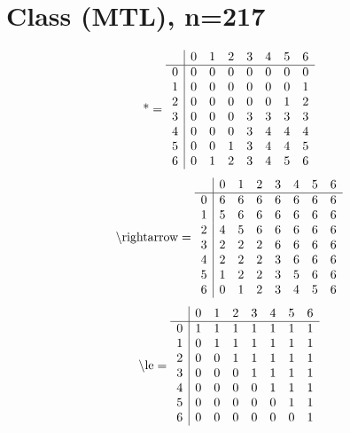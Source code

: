 \documentclass[11pt]{article}
\begin{document}
\section{Class (MTL), n=217}
\[\text{*} = 
\begin{array}{r | r r r r r r r}
 & 0 & 1 & 2 & 3 & 4 & 5 & 6 \\ \hline
0 & 0 & 0 & 0 & 0 & 0 & 0 & 0 \\
1 & 0 & 0 & 0 & 0 & 0 & 0 & 1 \\
2 & 0 & 0 & 0 & 0 & 0 & 1 & 2 \\
3 & 0 & 0 & 0 & 3 & 3 & 3 & 3 \\
4 & 0 & 0 & 0 & 3 & 4 & 4 & 4 \\
5 & 0 & 0 & 1 & 3 & 4 & 4 & 5 \\
6 & 0 & 1 & 2 & 3 & 4 & 5 & 6 \\
\end{array}
\]
\[\text{\textbackslash rightarrow} = 
\begin{array}{r | r r r r r r r}
 & 0 & 1 & 2 & 3 & 4 & 5 & 6 \\ \hline
0 & 6 & 6 & 6 & 6 & 6 & 6 & 6 \\
1 & 5 & 6 & 6 & 6 & 6 & 6 & 6 \\
2 & 4 & 5 & 6 & 6 & 6 & 6 & 6 \\
3 & 2 & 2 & 2 & 6 & 6 & 6 & 6 \\
4 & 2 & 2 & 2 & 3 & 6 & 6 & 6 \\
5 & 1 & 2 & 2 & 3 & 5 & 6 & 6 \\
6 & 0 & 1 & 2 & 3 & 4 & 5 & 6 \\
\end{array}
\]
\[\text{\textbackslash le} = 
\begin{array}{r | r r r r r r r}
 & 0 & 1 & 2 & 3 & 4 & 5 & 6 \\ \hline
0 & 1 & 1 & 1 & 1 & 1 & 1 & 1 \\
1 & 0 & 1 & 1 & 1 & 1 & 1 & 1 \\
2 & 0 & 0 & 1 & 1 & 1 & 1 & 1 \\
3 & 0 & 0 & 0 & 1 & 1 & 1 & 1 \\
4 & 0 & 0 & 0 & 0 & 1 & 1 & 1 \\
5 & 0 & 0 & 0 & 0 & 0 & 1 & 1 \\
6 & 0 & 0 & 0 & 0 & 0 & 0 & 1 \\
\end{array}
\]
\end{document}
